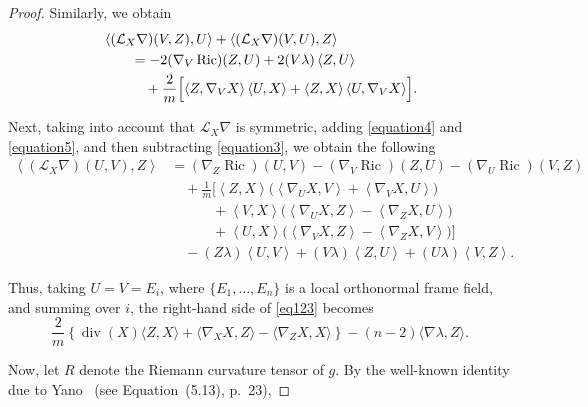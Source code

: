 \documentclass[a4paper, 12pt]{amsart}
\theoremstyle{definition}
\numberwithin{figure}{section}
\begin{document}
\begin{proof}
Similarly, we obtain
\begin{equation}\label{equation5}
\begin{split}
&
\left\langle (\mathcal{L}_X\nabla)(V,Z),U \right\rangle
+
\left\langle (\mathcal{L}_X\nabla)(V,U),Z \right\rangle
\\
&\qquad
=
-2(\nabla_V\operatorname{Ric})(Z,U)
+2(V\lambda)\left\langle Z,U \right\rangle
\\
&\qquad\quad
+\frac{2}{m}\Bigl[
\left\langle Z,\nabla_VX \right\rangle
\left\langle U,X \right\rangle
+
\left\langle Z,X \right\rangle
\left\langle U,\nabla_VX \right\rangle
\Bigr].
\end{split}
\end{equation}

Next,  taking into account that \(\mathcal{L}_X\nabla\) is symmetric, adding \eqref{equation4} and \eqref{equation5}, and then subtracting \eqref{equation3}, we obtain the following
\begin{equation}\label{eq123}
\begin{split}
\left\langle (\mathcal{L}_X\nabla)(U,V),Z \right\rangle
&=(\nabla_Z\operatorname{Ric})(U,V)
-(\nabla_V\operatorname{Ric})(Z,U)
-(\nabla_U\operatorname{Ric})(V,Z)
\\
&\quad
+\frac1m\Big[
\left\langle Z,X \right\rangle
\Big(
\left\langle \nabla_UX,V \right\rangle
+\left\langle \nabla_VX,U \right\rangle
\Big)
\\
&\qquad\quad
+\left\langle V,X \right\rangle
\Big(
\left\langle \nabla_UX,Z \right\rangle
-\left\langle \nabla_ZX,U \right\rangle
\Big)
\\
&\qquad\quad
+\left\langle U,X \right\rangle
\Big(
\left\langle \nabla_VX,Z \right\rangle
-\left\langle \nabla_ZX,V \right\rangle
\Big)
\Big]
\\
&\quad
-(Z\lambda)\left\langle U,V \right\rangle
+(V\lambda)\left\langle Z,U \right\rangle
+(U\lambda)\left\langle V,Z \right\rangle .
\end{split}
\end{equation}

Thus, taking \(U=V=E_i\), where \(\{E_1,\dots,E_n\}\) is a local orthonormal frame field, and summing over \(i\), the right-hand side of \eqref{eq123} becomes
\[
\frac{2}{m}\left\{
\operatorname{div}(X)\langle Z,X\rangle
+\langle \nabla_XX,Z\rangle
-\langle \nabla_ZX,X\rangle
\right\}
-(n-2)\langle\nabla\lambda,Z\rangle .
\]

Now, let $R$ denote the Riemann curvature tensor of $g$. 
By the well-known identity due to Yano~\cite{Yan70} (see Equation~(5.13), p.~23),


\end{proof}
\end{document}
